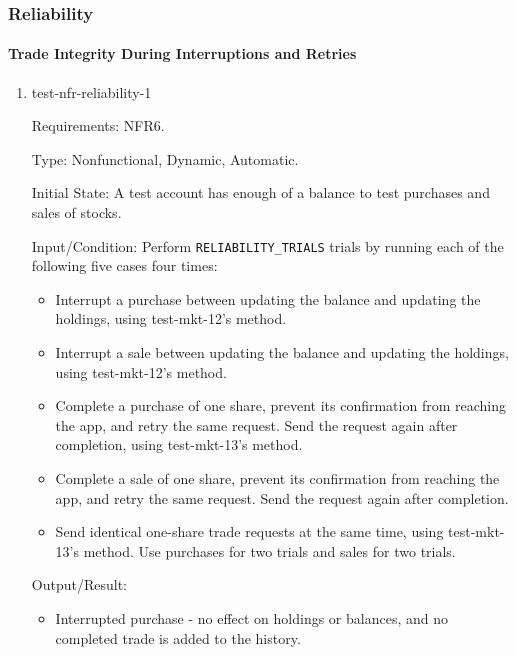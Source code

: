 \documentclass[12pt, titlepage]{article}
\begin{document}
\subsubsection{Reliability}

\paragraph{Trade Integrity During Interruptions and Retries}

\begin{enumerate}

\item{test-nfr-reliability-1\\}

Requirements: NFR6.

Type: Nonfunctional, Dynamic, Automatic.

Initial State: A test account has enough of a balance to test purchases
and sales of stocks.

Input/Condition: Perform \texttt{RELIABILITY\_TRIALS}  trials
by running each of the following five cases four times:

\begin{itemize}
    \item Interrupt a purchase between updating the balance and
    updating the holdings, using test-mkt-12's method.

    \item Interrupt a sale between updating the balance and
    updating the holdings, using test-mkt-12's method.

    \item Complete a purchase of one share, prevent its confirmation
    from reaching the app, and retry the same request. Send the
    request again after completion, using test-mkt-13's method.

    \item Complete a sale of one share, prevent its confirmation
    from reaching the app, and retry the same request. Send the
    request again after completion.

    \item Send identical one-share trade requests at the same time,
    using test-mkt-13's method. Use purchases for two trials and
    sales for two trials.
\end{itemize}


Output/Result:

\begin{itemize}
    \item Interrupted purchase - no effect on holdings or balances,
    and no completed trade is added to the history.


\end{itemize}
\end{enumerate}
\end{document}
